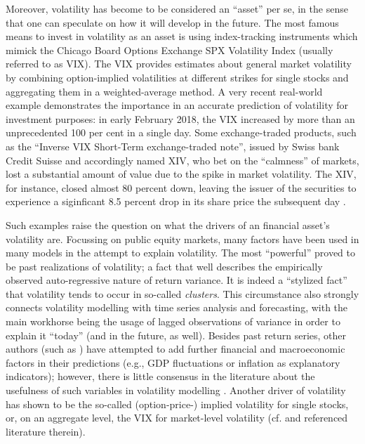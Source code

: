 Moreover, volatility has become to be considered an \enquote{asset} per se, in the sense that one can speculate on how it will develop in the future. The most famous means to invest in volatility as an asset is using index-tracking instruments which mimick the Chicago Board Options Exchange SPX Volatility Index (usually referred to as VIX). The VIX provides estimates about general market volatility by combining option-implied volatilities at different strikes for single stocks and aggregating them in a weighted-average method. A very recent real-world example demonstrates the importance in an accurate prediction of volatility for investment purposes: in early February 2018, the VIX increased by more than an unprecedented 100 per cent in a single day. Some exchange-traded products, such as the \enquote{Inverse VIX Short-Term exchange-traded note}, issued by Swiss bank Credit Suisse and accordingly named XIV, who bet on the “calmness” of markets, lost a substantial amount of value due to the spike in market volatility. The XIV, for instance, closed almost 80 percent down, leaving the issuer of the securities to experience a siginficant 8.5 percent drop in its share price the subsequent day \parencite{CNBC2018}.


Such examples raise the question on what the drivers of an financial asset's volatility are. Focussing on public equity markets, many factors have been used in many models in the attempt to explain volatility. The most \enquote{powerful} proved to be past realizations of volatility; a fact that well describes the empirically observed auto-regressive nature of return variance. It is indeed a \enquote{stylized fact} that volatility tends to occur in so-called \emph{clusters}. This circumstance also strongly connects volatility modelling with time series analysis and forecasting, with the main workhorse being the usage of lagged observations of variance in order to explain it \enquote{today} (and in the future, as well). 
Besides past return series, other authors (such as \textcite{Paye_VolaMacro_2012}) have attempted to add further financial and macroeconomic factors in their predictions (e.g., GDP fluctuations or inflation as explanatory indicators); however, there is little consensus in the literature about the usefulness of such variables in volatility modelling \parencite[2]{MittnikRobinzonovSpindler_2015}. Another driver of volatility has shown to be the so-called (option-price-) implied volatility for single stocks, or, on an aggregate level, the VIX for market-level volatility (cf. \textcite{MittnikRobinzonovSpindler_2015} and referenced literature therein). 

